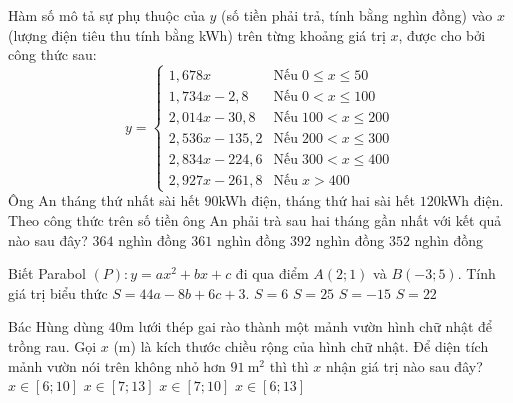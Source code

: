 \begin{ex}%
	Hàm số mô tả sự phụ thuộc của $y$ (số tiền phải trả, tính bằng nghìn đồng) vào $x$ (lượng điện tiêu thu tính bằng kWh) trên từng khoảng giá trị $x$, được cho bởi công thức sau:
	$$
	y= \begin{cases}1{,}678 x & \text{Nếu}\; 0 \leq x \leq 50 \\ 1{,}734 x-2{,}8 & \text{Nếu}\; 0<x \leq 100 \\ 2{,}014 x-30{,}8 &\text{Nếu}\; 100<x \leq 200 \\ 2{,}536 x-135{,}2 &\text{Nếu}\; 200<x \leq 300 \\ 2{,}834 x-224{,}6 &\text{Nếu}\; 300<x \leq 400 \\ 2{,}927 x-261{,}8 & \text{Nếu}\; x>400\end{cases}
	$$
	Ông An tháng thứ nhất sài hết $90$kWh điện, tháng thứ hai sài hết $120$kWh điện. Theo công thức trên số tiền ông An phải trà sau hai tháng gần nhất với kết quả nào sau đây?
	\choice
	{\True $364$ nghìn đồng}
	{$361$ nghìn đồng}
	{$392$ nghìn đồng}
	{$352$ nghìn đồng}
\end{ex}
\begin{ex}%
	Biết Parabol $(P)\colon y=ax^2+bx+c$ đi qua điểm $A(2; 1)$ và $B(-3; 5)$. Tính giá trị biểu thức $S=44a-8b+6c+3$.
	\choice
	{$S=6$}
	{\True $S=25$}
	{$S=-15$}
	{$S=22$}
\end{ex}
\begin{ex}%
	Bác Hùng dùng $40$m lưới thép gai rào thành một mảnh vườn hình chữ nhật để trồng rau. Gọi $x$ (m) là kích thước chiều rộng của hình chữ nhật. Để diện tích mảnh vườn nói trên không nhỏ hơn $91\mathrm{~m}^2$ thì thì $x$ nhận giá trị nào sau đây?
	\choice
	{$x\in[6; 10]$}
	{$x\in[7; 13]$}
	{\True  $x\in[7; 10]$}
	{$x\in[6; 13]$}
\end{ex}
